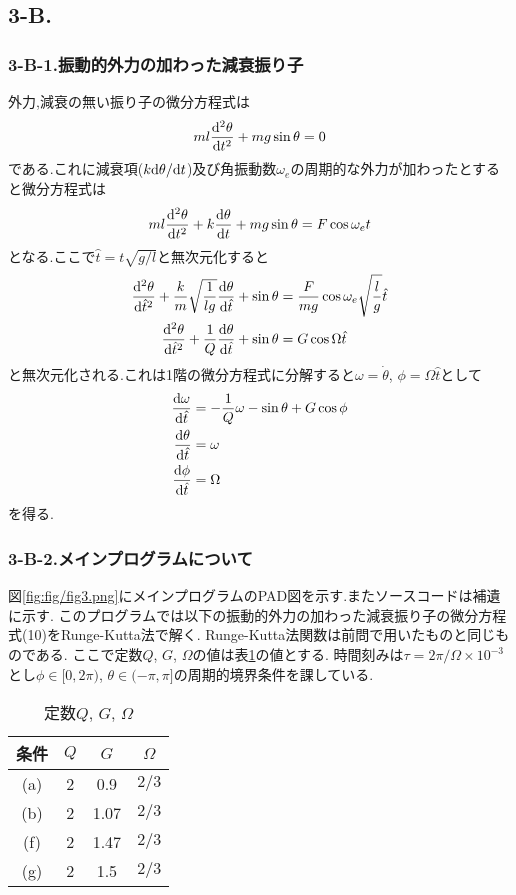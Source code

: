\subsection*{3-B.}
\subsubsection*{3-B-1.振動的外力の加わった減衰振り子}
外力,減衰の無い振り子の微分方程式は
\begin{align}
  ml\frac{{\rm d}^2\theta}{{\rm d}t^2}+mg\sin \theta=0
\end{align}
である.これに減衰項($k{\rm d}\theta/{\rm d}t$)及び角振動数$\omega_e$の周期的な外力が加わったとすると微分方程式は
\begin{align}
  ml\frac{{\rm d}^2\theta}{{\rm d}t^2}+k\frac{{\rm d}\theta}{{\rm d}t}+mg\sin \theta=F\cos\omega_et
\end{align}
となる.ここで$\hat{t}=t\sqrt{g/l}$と無次元化すると
\begin{align}
  \begin{split}
    \frac{{\rm d}^2\theta}{{\rm d}\hat{t}^2}+\frac{k}{m}\sqrt{\frac{1}{lg}}\frac{{\rm d}\theta}{{\rm d}\hat{t}}+\sin\theta&=\frac{F}{mg}\cos\omega_e\sqrt{\frac{l}{g}}\hat{t}\\
    \frac{{\rm d}^2\theta}{{\rm d}\hat{t}^2}+\frac{1}{Q}\frac{{\rm d}\theta}{{\rm d}\hat{t}}+\sin\theta&=G\cos\Omega\hat{t}
  \end{split}
\end{align}
と無次元化される.これは1階の微分方程式に分解すると$\omega=\dot{\theta}$, $\phi=\Omega\hat{t}$として
\begin{align}
  \begin{split}
    \frac{{\rm d}\omega}{{\rm d}\hat{t}}&=-\frac{1}{Q}\omega-\sin\theta+G\cos\phi\\
    \frac{{\rm d}\theta}{{\rm d}\hat{t}}&=\omega\\
    \frac{{\rm d}\phi}{{\rm d}\hat{t}}&=\Omega
  \end{split}
\end{align}
を得る.
\subsubsection*{3-B-2.メインプログラムについて}
図\ref{fig:fig/fig3.png}にメインプログラムのPAD図を示す.またソースコードは補遺に示す.
このプログラムでは以下の振動的外力の加わった減衰振り子の微分方程式(10)をRunge-Kutta法で解く.
Runge-Kutta法関数は前問で用いたものと同じものである.
ここで定数$Q$, $G$, $\Omega$の値は表\ref{tab:qgo}の値とする.
時間刻みは$\tau=2\pi/\Omega\times10^{-3}$とし$\phi\in[0,2\pi)$, $\theta\in(-\pi,\pi]$の周期的境界条件を課している.
\begin{table}[h]
\caption{定数$Q$, $G$, $\Omega$}
\label{tab:qgo}
\centering
\begin{tabular}{cccc}
\hline
条件&$Q$&$G$&$\Omega$\\
\hline \hline
(a)&2&0.9&$2/3$\\
(b)&2&1.07&$2/3$\\
(f)&2&1.47&$2/3$\\
(g)&2&1.5&$2/3$\\
\hline
\end{tabular}
\end{table}
